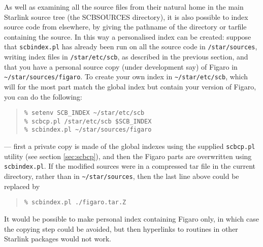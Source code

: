 \documentclass[twoside,11pt]{article}
\renewcommand{\_}{\texttt{\symbol{95}}}
\begin{document}
As well as examining all the source files from their natural home
in the main Starlink source tree (the SCB\_SOURCES directory),
it is also possible to index source code from elsewhere, 
by giving the pathname of the directory
or tarfile containing the source.
In this way a personalised index can be created: 
suppose that {\tt scbindex.pl} has already been run 
on all the source code in {\tt /star/sources}, 
writing index files in {\tt /star/etc/scb}, as described in 
the previous section, 
and that you have a personal source copy (under development say) of 
Figaro in \verb|~/star/sources/figaro|.
To create your own index in \verb|~/star/etc/scb|, 
which will for the most part match the global index 
but contain your version of Figaro,
you can do the following:
\begin{quote}
\begin{verbatim}
% setenv SCB_INDEX ~/star/etc/scb
% scbcp.pl /star/etc/scb $SCB_INDEX
% scbindex.pl ~/star/sources/figaro
\end{verbatim}
\end{quote}
--- first a private copy is made of the global indexes using 
the supplied {\tt scbcp.pl} utility (see section \ref{sec:scbcp}),
and then the Figaro parts are overwritten using {\tt scbindex.pl}.
If the modified sources were 
in a compressed tar file in the current directory, 
rather than in \verb|~/star/sources|,
then the last line above could be replaced by
\begin{quote}
\begin{verbatim}
% scbindex.pl ./figaro.tar.Z
\end{verbatim}
\end{quote}
It would be possible to make personal index containing Figaro only,
in which case the copying step could be avoided, 
but then hyperlinks to routines in other Starlink packages 
would not work.
\end{document}
